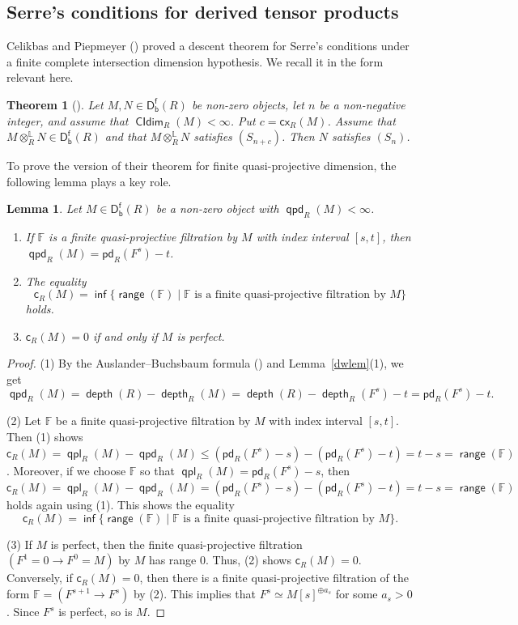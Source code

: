 \documentclass[10pt, a4paper,reqno]{amsart}
\newtheorem{thm}{Theorem}[section]
\newtheorem{lem}[lem]{Lemma}
\theoremstyle{definition}
\theoremstyle{remark}
\numberwithin{equation}{thm}
\def\FF{\mathbb{F}}
\def\c{\mathsf{c}}
\def\depth{\operatorname{\mathsf{depth}}}
\def\Dfb{\mathsf{D^f_b}}
\def\ltensor{\otimes^{\mathbb{L}}}
\def\inf{\operatorname{\mathsf{inf}}}
\def\range{\operatorname{\mathsf{range}}}
\def\cx{\mathsf{cx}}
\def\CIdim{\operatorname{\mathsf{CIdim}}}
\def\pd{\mathsf{pd}}
\def\qpd{\operatorname{\mathsf{qpd}}}
\def\qpl{\operatorname{\mathsf{qpl}}}
\begin{document}
\subsection{Serre's conditions for derived tensor products}

Celikbas and Piepmeyer (\cite{CP}) proved a descent theorem for Serre’s conditions under a finite complete intersection dimension hypothesis.
We recall it in the form relevant here.

\begin{thm}[{\cite[Theorem 3.1]{CP}}]\label{thm:CP}
Let $M,N\in\Dfb(R)$ be non-zero objects, let $n$ be a non-negative integer, and assume that $\CIdim_R(M)<\infty$. 
Put $c=\cx_R(M)$.
Assume that $M \ltensor_R N \in \Dfb(R)$ and that $M \ltensor_R N$ satisfies $(S_{n+c})$.	
Then $N$ satisfies $(S_n)$.
\end{thm}

To prove the version of their theorem for finite quasi-projective dimension, the following lemma plays a key role.

\begin{lem}\label{key}
Let $M\in\Dfb(R)$ be a non-zero object with $\qpd_R(M) < \infty$.
\begin{enumerate}[\rm(1)]
\item	
If $\FF$ is a finite quasi-projective filtration by $M$ with index interval $[s,t]$, then $\qpd_R(M) = \pd_R(F^s) -t$.
\item
The equality
\[
\c_R(M) = \inf\{\range(\FF) \mid \FF \mbox{ is a finite quasi-projective filtration by $M$}\}
\]
holds.
\item
$\c_R(M) = 0$ if and only if $M$ is perfect.
\end{enumerate}
\end{lem}

\begin{proof}
(1) By the Auslander--Buchsbaum formula () and Lemma~\ref{dwlem}(1), we get
\[
\qpd_R(M) = \depth(R) - \depth_R(M) = \depth(R) - \depth_R(F^s) - t = \pd_R(F^s) -t.
\]

(2) Let $\FF$ be a finite quasi-projective filtration by $M$ with index interval $[s,t]$.
Then (1) shows $\c_R(M) = \qpl_R(M) - \qpd_R(M) \le (\pd_R(F^s) -s) - (\pd_R(F^s) -t) = t-s = \range(\FF)$.
Moreover, if we choose $\FF$ so that $\qpl_R(M) = \pd_R(F^s) - s$, then $\c_R(M) = \qpl_R(M) - \qpd_R(M) = (\pd_R(F^s) -s) - (\pd_R(F^s) -t) = t-s = \range(\FF)$ holds again using (1).
This shows the equality
\[
\c_R(M) = \inf\{\range(\FF) \mid \FF \mbox{ is a finite quasi-projective filtration by $M$}\}.
\]

(3) If $M$ is perfect, then the finite quasi-projective filtration $(F^1=0 \to F^0 = M)$ by $M$ has range $0$.
Thus, (2) shows $\c_R(M) = 0$.
Conversely, if $\c_R(M) = 0$, then there is a finite quasi-projective filtration of the form $\FF =  (F^{s+1} \to F^s)$ by (2).
This implies that $F^s \simeq M[s]^{\oplus a_s}$ for some $a_s > 0$.
Since $F^s$ is perfect, so is $M$.
\end{proof}
\end{document}

